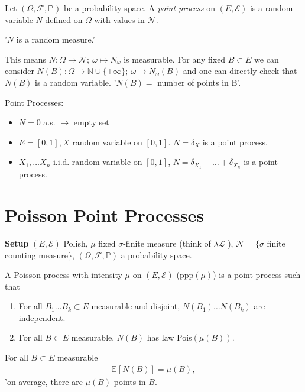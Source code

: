 \begin{defn}
	Let $(\Omega, \mathcal{F}, \mathbb{P}_{}) $ be a probability space. A \emph{point process} on $(E, \mathcal{E})$ is a random variable $N$ defined on $\Omega $ with values in $\mathcal{N}$.
\end{defn}

'$N$ is a random measure.'

This means $N: \Omega \to \mathcal{N};\ \omega \mapsto N_{\omega } $ is measurable. For any fixed $B \subset E$ we can consider $N(B): \Omega \to \mathbb{N}\cup \{+\infty\};\ \omega \mapsto N_{\omega }(B)$ and one can directly check that $N(B)$ is a random variable. 
'$N(B)=$ number of points in B'.

\begin{ex}[] Point Processes:
\begin{itemize}
	\item $N=0$ a.s.  $\to$ empty set
	\item $E=[0,1], X$ random variable on  $[0,1]$.  $N=\delta_X$ is a point process.
	\item $X_1, \ldots X_n$ i.i.d. random variable on $[0,1]$,  $N=\delta_{X_1}+ \ldots +\delta_{X_n}$ is a point process.
\end{itemize}
\end{ex}

\section{Poisson Point Processes}
\textbf{Setup} $(E, \mathcal{E})$ Polish, $\mu$ fixed $\sigma$-finite measure (think of $\lambda \mathcal{L}$ ), $\mathcal{N}=\{\sigma$ finite counting measure$\}$, $(\Omega, \mathcal{F}, \mathbb{P} )$ a probability space.

\begin{defn}
	A Poisson process with intensity $\mu$ on $(E, \mathcal{E})$ (ppp$(\mu)$) is a point process such that
 \begin{enumerate}
	 \item For all $B_1 \ldots B_k \subset E$ measurable and disjoint, $N(B_1) \ldots N(B_k)$ are independent.
	 \item For all $B \subset E$ measurable, $N(B)$ has law Pois$(\mu(B))$.
\end{enumerate}
\end{defn}
\begin{rmk}[]
	For all $B \subset E$ measurable
	\begin{align}
		\mathbb{E}_{} \left[ N(B) \right] = \mu(B),
	\end{align}
	'on average, there are $\mu (B)$ points in $B$.
\end{rmk}

